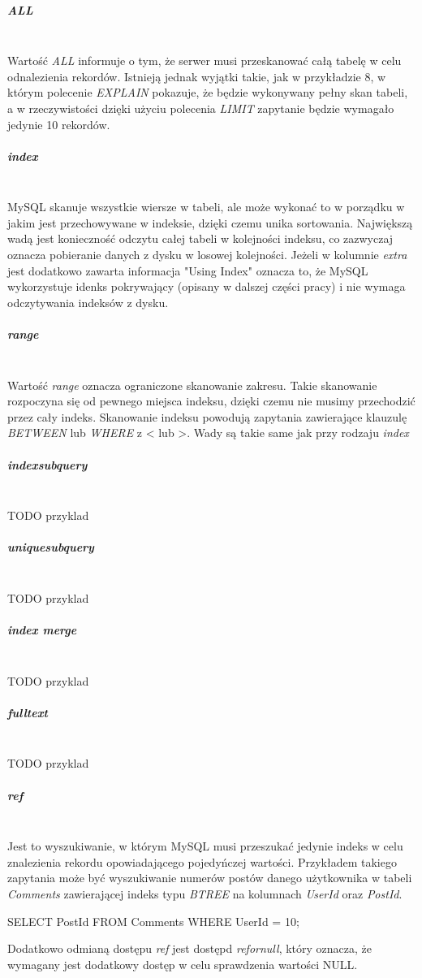 \subparagraph{ALL}\leavevmode\\
Wartość \textit{ALL} informuje o tym, że serwer musi przeskanować całą tabelę w celu odnalezienia rekordów. Istnieją jednak wyjątki takie, jak w przykładzie 8, w którym polecenie \textit{EXPLAIN} pokazuje, że będzie wykonywany pełny skan tabeli, a w rzeczywistości dzięki użyciu polecenia \textit{LIMIT} zapytanie będzie wymagało jedynie 10 rekordów.

\subparagraph{index}\leavevmode\\
MySQL skanuje wszystkie wiersze w tabeli, ale może wykonać to w porządku w jakim jest przechowywane w indeksie, dzięki czemu unika sortowania. Największą wadą jest konieczność odczytu całej tabeli w kolejności indeksu, co zazwyczaj oznacza pobieranie danych z dysku w losowej kolejności. Jeżeli w kolumnie \textit{extra} jest dodatkowo zawarta informacja "Using Index" oznacza to, że MySQL wykorzystuje idenks pokrywający (opisany w dalszej części pracy) i nie wymaga odczytywania indeksów z dysku.

\subparagraph{range}\leavevmode\\
Wartość \textit{range} oznacza ograniczone skanowanie zakresu. Takie skanowanie rozpoczyna się od pewnego miejsca indeksu, dzięki czemu nie musimy przechodzić przez cały indeks. Skanowanie indeksu powodują zapytania zawierające klauzulę \textit{BETWEEN} lub \textit{WHERE} z < lub >. Wady są takie same jak przy rodzaju \textit{index}

\subparagraph{index\textunderscore subquery}\leavevmode\\
TODO przyklad
\subparagraph{unique\textunderscore subquery}\leavevmode\\
TODO przyklad
\subparagraph{index merge}\leavevmode\\
TODO przyklad
\subparagraph{fulltext}\leavevmode\\
TODO przyklad

\subparagraph{ref}\leavevmode\\
Jest to wyszukiwanie, w którym MySQL musi przeszukać jedynie indeks w celu znalezienia rekordu opowiadającego pojedyńczej wartości.
Przykładem takiego zapytania może być wyszukiwanie numerów postów danego użytkownika w tabeli \textit{Comments} zawierającej indeks typu \textit{BTREE} na kolumnach \textit{UserId} oraz \textit{PostId}.

\begin{spverbatim}
	SELECT PostId FROM Comments WHERE UserId = 10;
\end{spverbatim}
Dodatkowo odmianą dostępu \textit{ref} jest dostępd \textit{ref\textunderscore or\textunderscore null}, który oznacza, że wymagany jest dodatkowy dostęp w celu sprawdzenia wartości NULL.


